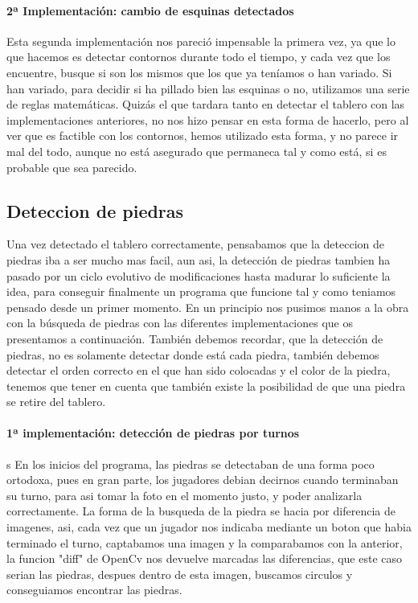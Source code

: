 \documentclass[12pt,a4paper]{report}
\begin{document}
\paragraph{2ª Implementación: cambio de esquinas detectados} 

Esta segunda implementación nos pareció impensable la primera vez, ya que lo que
hacemos es detectar contornos durante todo el tiempo, y cada vez que los
encuentre, busque si son los mismos que los que ya teníamos o han variado. Si
han variado, para decidir si ha pillado bien las esquinas o no, utilizamos una
serie de reglas matemáticas. 
Quizás el que tardara tanto en detectar el tablero con las implementaciones
anteriores, no nos hizo pensar en esta forma de hacerlo, pero al ver que es
factible con los contornos, hemos utilizado esta forma, y no parece ir mal del
todo, aunque no está asegurado que permaneca tal y como está, si es probable que
sea parecido. 


\subsection{Deteccion de piedras} 

Una vez detectado el tablero correctamente,
pensabamos que la deteccion de piedras iba a ser mucho mas facil, aun asi, la
detección de piedras tambien ha pasado por un ciclo evolutivo de modificaciones
hasta madurar lo suficiente la idea, para conseguir finalmente un programa que
funcione tal y como teniamos pensado desde un primer momento. En un principio
nos pusimos manos a la obra con la búsqueda de piedras con las diferentes
implementaciones que os presentamos a continuación.
También debemos recordar, que la detección de
piedras, no es solamente detectar donde está cada piedra, también debemos
detectar el orden correcto en el que han sido colocadas y el color de la piedra,
tenemos que tener en cuenta que también existe la posibilidad de que una piedra
se retire del tablero. 

\paragraph{1ª implementación: detección de piedras por turnos}s
En los inicios del programa, las piedras se detectaban de una forma poco
ortodoxa, pues en gran parte, los jugadores debian decirnos cuando terminaban su
turno, para asi tomar la foto en el momento justo, y poder analizarla
correctamente.  La forma de la busqueda de la piedra se hacia por diferencia de
imagenes, asi, cada vez que un jugador nos indicaba mediante un boton que habia
terminado el turno, captabamos una imagen y la comparabamos con la anterior, la
funcion "diff" de OpenCv nos devuelve marcadas las diferencias, que este caso
serian las piedras, despues dentro de esta imagen, buscamos circulos y
conseguiamos encontrar las piedras.  
\end{document}
